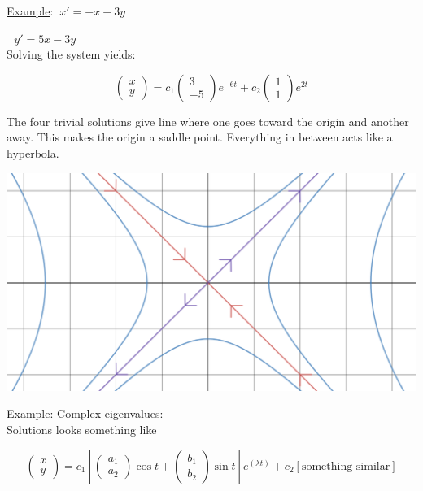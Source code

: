 \documentclass[12pt]{article}
\numberwithin{equation}{subsection}
\newcommand{\indd}{\hspace{2cm}}
\newcommand{\exa}{\noindent \underline{Example}: \hspace{1cm}}
\begin{document}
\newpage

\exa $\ x'=-x+3y$

\indd $\ \ \ y'=5x-3y$\\

Solving the system yields:

$$ \begin{pmatrix}
x \\ y
\end{pmatrix}=c_1\begin{pmatrix}
3 \\ -5
\end{pmatrix}e^{-6t}+c_2\begin{pmatrix}
1 \\ 1
\end{pmatrix}e^{2t}$$

The four trivial solutions give line where one goes toward the origin and another away. This makes the origin a saddle point. Everything in between acts like a hyperbola.
\begin{center}
\includegraphics[scale=.25]{sketch2}\\
\end{center}

\exa Complex eigenvalues:\\

Solutions looks something like 

$$\begin{pmatrix}
x \\ y
\end{pmatrix} = c_1 \left[ \begin{pmatrix}
a_1 \\ a_2
\end{pmatrix} \cos t + \begin{pmatrix}
b_1 \\ b_2
\end{pmatrix} \sin t \right]e^{(\lambda t)}+c_2[\textrm{something similar}] $$
\end{document}
